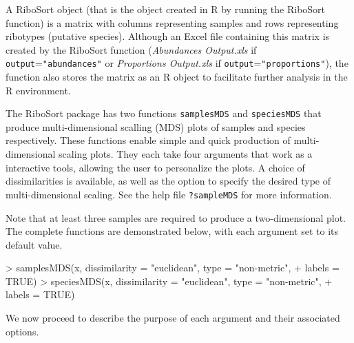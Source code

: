 \documentclass[a4paper]{article}
\begin{document}
A RiboSort object (that is the object created in R by running the RiboSort function) is a matrix with columns representing samples and rows representing ribotypes (putative species). Although an Excel file containing this matrix is created by the RiboSort function ({\em Abundances Output.xls} if \texttt{output}=\texttt{"abundances"} or {\em Proportions Output.xls} if \texttt{output}=\texttt{"proportions"}), the function also stores the matrix as an R object to facilitate further  analysis in the R environment.

The RiboSort package has two functions \texttt{samplesMDS} and \texttt{speciesMDS} that produce multi-dimensional scalling (MDS) plots of samples and species respectively. These functions enable simple and quick production of multi-dimensional scaling plots. They each take four arguments that work as a interactive tools, allowing the user to personalize the plots.  A choice of dissimilarities is available, as well as the option to specify the desired type of multi-dimensional scaling. See the help file \texttt{?sampleMDS} for more information.

Note that at least three samples are required to produce a two-dimensional plot. The complete functions are demonstrated below, with each argument set to its default value.

\begin{Schunk}
\begin{Sinput}
> samplesMDS(x, dissimilarity = "euclidean", type = "non-metric", 
+     labels = TRUE)
> speciesMDS(x, dissimilarity = "euclidean", type = "non-metric", 
+     labels = TRUE)
\end{Sinput}
\end{Schunk}
We now proceed to describe the purpose of each argument and their associated options.
\end{document}
